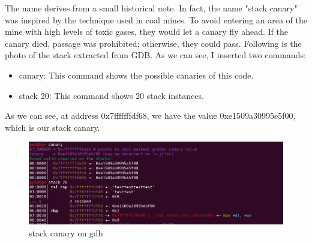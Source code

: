 \documentclass{report}
\begin{document}
    The name derives from a small historical note. In fact, the name "stack canary" was inspired by the technique used in coal mines.\newline
    To avoid entering an area of the mine with high levels of toxic gases, they would let a canary fly ahead.\newline
    If the canary died, passage was prohibited; otherwise, they could pass.
    \clearpage
    Following is the photo of the stack extracted from GDB. As we can see, I inserted two commands:
    \begin{itemize}
      \item \hspace{1em} canary: This command shows the possible canaries of this code.
      \item \hspace{1em} stack 20: This command shows 20 stack instances.
    \end{itemize}
    As we can see, at address 0x7fffffffdf68, we have the value 0xe1509a30995e5f00, which is our stack canary.
    \begin{figure}
        \includegraphics[width=1.3\linewidth]{photo_of_the_stack_with_canary.png}
        \caption{ stack canary on gdb }
        \label{fig:  photo stack canary}
    \end{figure}
    \clearpage
\end{document}
